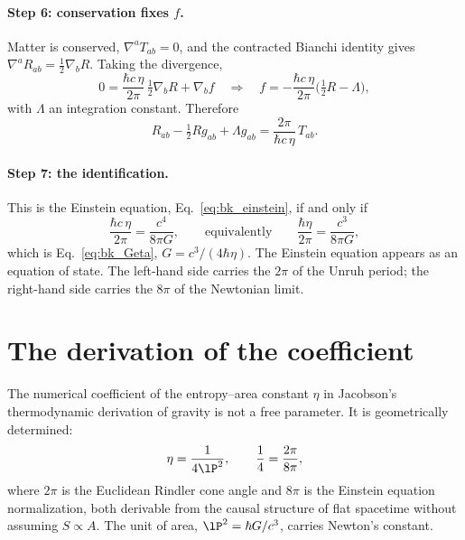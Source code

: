 \paragraph{Step 6: conservation fixes $f$.} Matter is conserved, $\nabla^aT_{ab}=0$, and the contracted Bianchi identity gives $\nabla^aR_{ab}=\tfrac12\nabla_bR$.
Taking the divergence,
\begin{equation}
0=\frac{\hbar c\,\eta}{2\pi}\,\tfrac12\nabla_bR+\nabla_bf\quad\Longrightarrow\quad f=-\frac{\hbar c\,\eta}{2\pi}\Big(\tfrac12R-\Lambda\Big),
\end{equation}
with $\Lambda$ an integration constant. Therefore
\begin{equation}
R_{ab}-\tfrac12Rg_{ab}+\Lambda g_{ab}=\frac{2\pi}{\hbar c\,\eta}\,T_{ab}.
\end{equation}

\paragraph{Step 7: the identification.} This is the Einstein equation, Eq.~\eqref{eq:bk_einstein}, if and only if
\begin{equation}
\frac{\hbar c\,\eta}{2\pi}=\frac{c^4}{8\pi G},\qquad\text{equivalently}\qquad\frac{\hbar\eta}{2\pi}=\frac{c^3}{8\pi G},\label{eq:bk_core}
\end{equation}
which is Eq.~\eqref{eq:bk_Geta}, $G=c^3/(4\hbar\eta)$. The Einstein equation appears as an equation of state. The left-hand side carries the $2\pi$ of the Unruh
period; the right-hand side carries the $8\pi$ of the Newtonian limit. \derived

\section{The derivation of the coefficient}\label{sec:bk_derivation}
\begin{keybox}[title={Proposition (geometric determination of the entropy coefficient)}]
The numerical coefficient of the entropy--area constant $\eta$ in Jacobson's thermodynamic derivation of gravity is not a free parameter. It is
geometrically determined:
\begin{equation}
\eta=\frac{1}{4\lP^2},\qquad\frac14=\frac{2\pi}{8\pi},\label{eq:bk_eta}
\end{equation}
where $2\pi$ is the Euclidean Rindler cone angle and $8\pi$ is the Einstein equation normalization, both derivable from the causal structure of flat
spacetime without assuming $S\propto A$. The unit of area, $\lP^2=\hbar G/c^3$, carries Newton's constant. \derived
\end{keybox}

